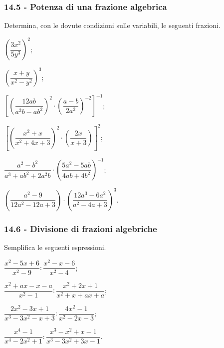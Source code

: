 \subsubsection*{14.5 - Potenza di una frazione algebrica}

\begin{esercizio}[\Ast]
\label{ese:14.17}
Determina, con le dovute condizioni sulle variabili, le seguenti frazioni.
\begin{multicols}{2}
\begin{enumeratea}
 \item $\left(\dfrac{3x^{2}}{5y^{3}}\right)^{2}$;
 \item $\left(\dfrac{x+y}{x^{2}-y^{2}}\right)^{3}$;
 \item $\left[\left(\dfrac{12ab}{a^{2}b-ab^{2}}\right)^{2}\cdot \left(\dfrac{a-b}{2a^{2}}\right)^{-2}\right]^{-1}$;
 \item $\left[\left(\dfrac{x^{2}+x}{x^{2}+4x+3}\right)^{2}\cdot \left(\dfrac{2x}{x+3}\right)\right]^{2}$;
 \item $\dfrac{a^{2}-b^{2}}{a^{3}+ab^{2}+2a^{2}b}\cdot\left(\dfrac{5a^{2}-5ab}{4ab+4b^{2}}\right)^{-1}$;
 \item $\left(\dfrac{a^{2}-9}{12a^{2}-12a+3}\right)\cdot \left(\dfrac{12a^{3}-6a^{2}}{a^{2}-4a+3}\right)^{3}$.
\end{enumeratea}
\end{multicols}
\end{esercizio}
\pagebreak
\subsubsection*{14.6 - Divisione di frazioni algebriche}

\begin{esercizio}[\Ast]
\label{ese:14.18}
Semplifica le seguenti espressioni.
\begin{multicols}{2}
\begin{enumeratea}
 \item $\dfrac{x^{2}-5x+6}{x^{2}-9}:\dfrac{x^{2}-x-6}{x^{2}-4}$;
 \item $\dfrac{x^{2}+ax-x-a}{x^{2}-1}:\dfrac{x^{2}+2x+1}{x^{2}+x+ax+a}$;
 \item $\dfrac{2x^{2}-3x+1}{x^{3}-3x^{2}-x+3}:\dfrac{4x^{2}-1}{x^{2}-2x-3}$;
 \item $\dfrac{x^{4}-1}{x^{4}-2x^{2}+1}:\dfrac{x^{3}-x^{2}+x-1}{x^{3}-3x^{2}+3x-1}$.
\end{enumeratea}
\end{multicols}
\end{esercizio}

